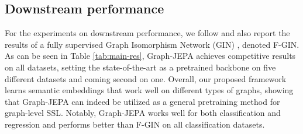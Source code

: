 \documentclass{article} \usepackage{iclr2024_conference,times}
\begin{document}
\subsection{Downstream performance} \label{sec:downstream}
For the experiments on downstream performance, we follow \citet{suresh2021adversarial} and also report the results of a fully supervised Graph Isomorphism Network (GIN) \citep{xu2018powerful}, denoted F-GIN. As can be seen in Table \ref{tab:main-res}, Graph-JEPA achieves competitive results on all datasets, setting the state-of-the-art as a pretrained backbone on five different datasets and coming second on one. Overall, our proposed framework learns semantic embeddings that work well on different types of graphs, showing that Graph-JEPA can indeed be utilized as a general pretraining method for graph-level SSL. Notably, Graph-JEPA works well for both classification and regression and performs better than F-GIN on all classification datasets.
\end{document}
